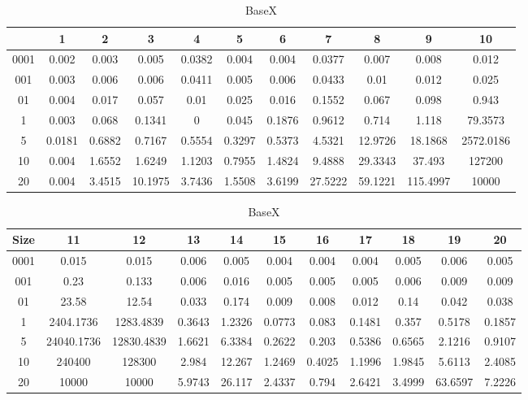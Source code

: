 \newpage
\begin{center}
\begin{table}[ht]
\tiny
\label{basex-query-result-table}
\caption{BaseX}
\begin{tabular}{|c|c|c|c|c|c|c|c|c|c|c| } 
    &  1 & 2 & 3 & 4 & 5 & 6 & 7 & 8 & 9 & 10 \\
 \hline
0001 & 0.002 & 0.003 & 0.005 & 0.0382 & 0.004 & 0.004 & 0.0377 & 0.007 & 0.008 & 0.012	\\
001 & 0.003 & 0.006 & 0.006 & 0.0411 & 0.005 & 0.006 & 0.0433 & 0.01 & 0.012 & 0.025	\\
01 & 0.004 & 0.017 & 0.057 & 0.01 & 0.025 & 0.016 & 0.1552 & 0.067 & 0.098 & 0.943	\\
1 & 0.003 & 0.068 & 0.1341 & 0 & 0.045 & 0.1876 & 0.9612 & 0.714 & 1.118 & 79.3573	\\
5 & 0.0181 & 0.6882 & 0.7167 & 0.5554 & 0.3297 & 0.5373 & 4.5321 & 12.9726 & 18.1868 & 2572.0186	\\
10 & 0.004 & 1.6552 & 1.6249 & 1.1203 & 0.7955 & 1.4824 & 9.4888 & 29.3343 & 37.493 & 127200	\\
20 & 0.004 & 3.4515 & 10.1975 & 3.7436 & 1.5508 & 3.6199 & 27.5222 & 59.1221 & 115.4997 & 10000	\\
\end{tabular}
\begin{tabular}{|c|c|c|c|c|c|c|c|c|c|c| } 
Size & 11 & 12 & 13 & 14 & 15 & 16 & 17 & 18 & 19 & 20	\\
\hline
0001 & 0.015 & 0.015 & 0.006 & 0.005 & 0.004 & 0.004 & 0.004 & 0.005 & 0.006 & 0.005	\\
001 & 0.23 & 0.133 & 0.006 & 0.016 & 0.005 & 0.005 & 0.005 & 0.006 & 0.009 & 0.009	\\
01 & 23.58 & 12.54 & 0.033 & 0.174 & 0.009 & 0.008 & 0.012 & 0.14 & 0.042 & 0.038	\\
1 & 2404.1736 & 1283.4839 & 0.3643 & 1.2326 & 0.0773 & 0.083 & 0.1481 & 0.357 & 0.5178 & 0.1857	\\
5 & 24040.1736 & 12830.4839 & 1.6621 & 6.3384 & 0.2622 & 0.203 & 0.5386 & 0.6565 & 2.1216 & 0.9107	\\
10 & 240400 & 128300 & 2.984 & 12.267 & 1.2469 & 0.4025 & 1.1996 & 1.9845 & 5.6113 & 2.4085	\\
20 & 10000 & 10000 & 5.9743 & 26.117 & 2.4337 & 0.794 & 2.6421 & 3.4999 & 63.6597 & 7.2226	\\
\end{tabular}
\end{table}


\end{center}
